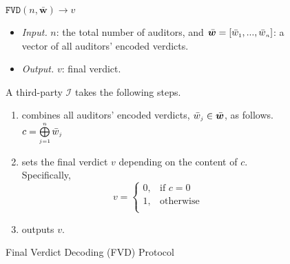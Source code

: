  \vspace{-2mm}
\begin{figure}[!htbp]
\setlength{\fboxsep}{1pt}
\begin{center}
    \begin{tcolorbox}[enhanced,width=81mm, height=55.5mm, left=0mm,
    drop fuzzy shadow southwest,
    colframe=black,colback=white]
   { \small{
    \vspace{-1.3mm}
\underline{$\mathtt{FVD}(n,  \bar{\bm w})\rightarrow  v$}\\
%
\vspace{-2.1mm}
\begin{itemize}[leftmargin=4.2mm]
\item \noindent\textit{Input.} $n$:  the total number of  auditors,  and  $\bar{\bm w}=[\bar{ w}_{\scriptscriptstyle 1},..., \bar{ w}_{\scriptscriptstyle n}]$:  a vector of all auditors' encoded  verdicts.
%
\item \noindent\textit{Output.} $v$: final verdict.  
%
\end{itemize}
A third-party $\mathcal{I}$ takes the following steps.
    \vspace{-1.3mm}
\begin{enumerate}[leftmargin=5mm]
%
\item combines  all auditors' encoded verdicts, $\bar w_{\scriptscriptstyle j}\in \bar{\bm {w}}$, as follows. 
%
$c= \bigoplus\limits^{\scriptscriptstyle n}_{\scriptscriptstyle j=1} \bar w_{\scriptscriptstyle j}$
%
\item sets the final verdict $v$ depending on the content of $c$. Specifically, 
%
\vspace{-1mm}
\begin{equation*}
   v= 
\begin{cases}
    0,              &\text{if } c= 0\\
   1 ,& \text{otherwise }\\
\end{cases}
\end{equation*}
%
\item outputs  $v$. 
\vspace{-1.5mm}
 \end{enumerate}
}}
\end{tcolorbox}
\end{center}
\vspace{-3mm}
\caption{Final Verdict Decoding  (FVD) Protocol} 
\label{fig:FVD}
\end{figure}


